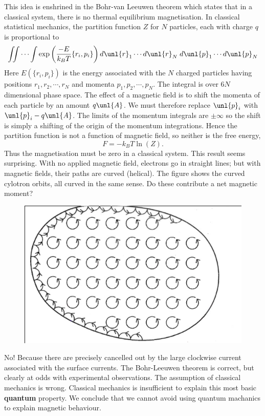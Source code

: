 \documentclass[a4paper, 11pt, normalem]{report}
\begin{document}
This idea is enshrined in the Bohr-van Leeuwen theorem which states that in a classical system, there is no thermal equilibrium magnetisation. 
In classical statistical mechanics, the partition function $Z$ for $N$ particles, each with charge $q$ is proportional to
\begin{equation}
    \iint \cdots \int \exp\left(\frac{-E}{k_BT}\{r_i,p_i\}\right) d\unl{r}_1\cdots d\unl{r}_N\; d\unl{p}_1\cdots d\unl{p}_N
\end{equation}
Here $E(\{r_i,p_i\})$ is the energy associated with the $N$ charged particles having positions $r_1,r_2,\cdots,r_N$ and momenta $p_1,p_2,\cdots,p_N$.
The integral is over $6N$ dimensional phase space.
The effect of a magnetic field is to shift the momenta of each particle by an amount $q\unl{A}$. 
We must therefore replace $\unl{p}_i$ with $\unl{p}_i-q\unl{A}$.
The limits of the momentum integrals are $\pm\infty$ so the shift is simply a shifting of the origin of the momentum integrations. 
Hence the partition function is not a function of magnetic field, so neither is the free energy,
\begin{equation}
    F = -k_BT\ln(Z).
\end{equation}
Thus the magnetisation must be zero in a classical system. 
This result seems surprising. 
With no applied magnetic field, electrons go in straight lines; but with magnetic fields, their paths are curved (helical). 
The figure shows the curved cylotron orbits, all curved in the same sense. 
Do these contribute a net magnetic moment?
\begin{figure}[H]
    \centering
    \includegraphics[scale=0.5]{cyclo.png}
\end{figure}
No!
Because there are precisely cancelled out by the large clockwise current associated with the surface currents. 
The Bohr-Leeuwen theorem is correct, but clearly at odds with experimental observations. 
The assumption of classical mechanics is wrong. 
Classical mechanics is insufficient to explain this most basic \textbf{quantum} property. 
We conclude that we cannot avoid using quantum machanics to explain magnetic behaviour. 
\end{document}
